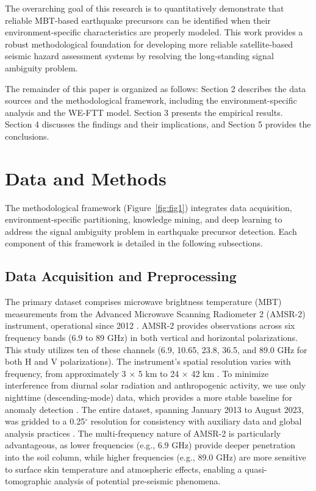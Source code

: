 \documentclass[preprint,review,12pt,authoryear]{elsarticle}
\begin{document}
The overarching goal of this research is to quantitatively demonstrate that reliable MBT-based earthquake precursors can be identified when their environment-specific characteristics are properly modeled. This work provides a robust methodological foundation for developing more reliable satellite-based seismic hazard assessment systems by resolving the long-standing signal ambiguity problem.

The remainder of this paper is organized as follows: Section 2 describes the data sources and the methodological framework, including the environment-specific analysis and the WE-FTT model. Section 3 presents the empirical results. Section 4 discusses the findings and their implications, and Section 5 provides the conclusions.

\section{Data and Methods}\label{sec:data_methods}

The methodological framework (Figure~\ref{fig:fig1}) integrates data acquisition, environment-specific partitioning, knowledge mining, and deep learning to address the signal ambiguity problem in earthquake precursor detection. Each component of this framework is detailed in the following subsections.

\subsection{Data Acquisition and Preprocessing}\label{sec:data_acquisition}

The primary dataset comprises microwave brightness temperature (MBT) measurements from the Advanced Microwave Scanning Radiometer 2 (AMSR-2) instrument, operational since 2012 \citep{kasaharaStatusAMSR22012}. AMSR-2 provides observations across six frequency bands (6.9 to 89 GHz) in both vertical and horizontal polarizations. This study utilizes ten of these channels (6.9, 10.65, 23.8, 36.5, and 89.0 GHz for both H and V polarizations). The instrument's spatial resolution varies with frequency, from approximately 3 $\times$ 5 km to 24 $\times$ 42 km \citep{kachiStatusGCOMW1AMSR22008}. To minimize interference from diurnal solar radiation and anthropogenic activity, we use only nighttime (descending-mode) data, which provides a more stable baseline for anomaly detection \citep{maedaDiscriminationLocalFaint2008}. The entire dataset, spanning January 2013 to August 2023, was gridded to a 0.25$^{\circ}$ resolution for consistency with auxiliary data and global analysis practices \citep{njokuRetrievalLandSurface1999,wuIdentifyingSeismicAnomalies2024}. The multi-frequency nature of AMSR-2 is particularly advantageous, as lower frequencies (e.g., 6.9 GHz) provide deeper penetration into the soil column, while higher frequencies (e.g., 89.0 GHz) are more sensitive to surface skin temperature and atmospheric effects, enabling a quasi-tomographic analysis of potential pre-seismic phenomena.
\end{document}
